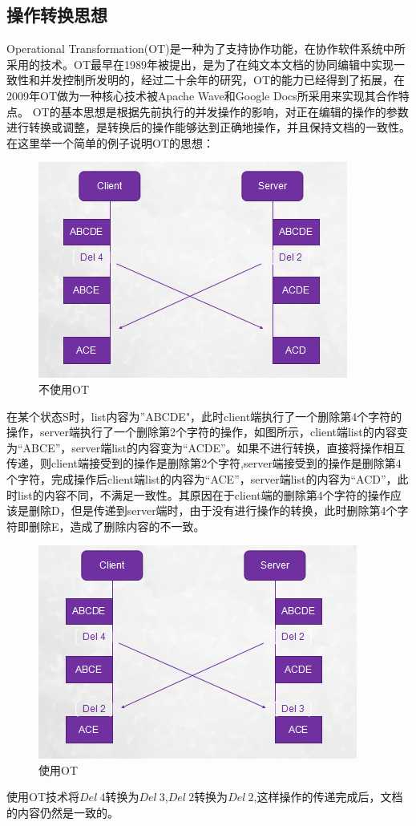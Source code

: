 \subsection{操作转换思想}
Operational Transformation(OT)是一种为了支持协作功能，在协作软件系统中所采用的技术。OT最早在1989年被提出，是为了在纯文本文档的协同编辑中实现一致性和并发控制所发明的，经过二十余年的研究，OT的能力已经得到了拓展，在2009年OT做为一种核心技术被Apache Wave和Google Docs所采用来实现其合作特点。
OT的基本思想是根据先前执行的并发操作的影响，对正在编辑的操作的参数进行转换或调整，是转换后的操作能够达到正确地操作，并且保持文档的一致性。
在这里举一个简单的例子说明OT的思想：
\begin{figure}[H]
\centering
\includegraphics{figures/exm1.bmp}
\caption{不使用OT}
\end{figure}
在某个状态S时，list内容为”ABCDE"，此时client端执行了一个删除第4个字符的操作，server端执行了一个删除第2个字符的操作，如图所示，client端list的内容变为“ABCE”，server端list的内容变为“ACDE”。如果不进行转换，直接将操作相互传递，则client端接受到的操作是删除第2个字符,server端接受到的操作是删除第4个字符，完成操作后client端list的内容为“ACE”，server端list的内容为“ACD”，此时list的内容不同，不满足一致性。其原因在于client端的删除第4个字符的操作应该是删除D，但是传递到server端时，由于没有进行操作的转换，此时删除第4个字符即删除E，造成了删除内容的不一致。
\begin{figure}[H]
\centering
\includegraphics{figures/exm2.bmp}
\caption{使用OT}
\end{figure}
使用OT技术将$Del\ 4$转换为$Del\ 3$,$Del\ 2$转换为$Del\ 2$,这样操作的传递完成后，文档的内容仍然是一致的。

